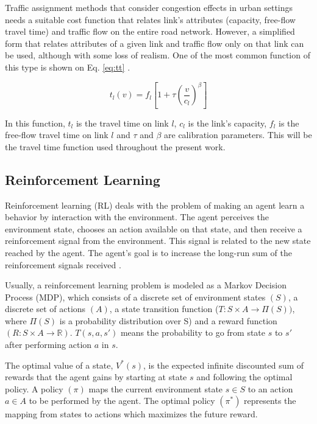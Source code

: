 \documentclass[12pt]{article}
\newcommand{\travTime}{\ensuremath{t_l}} 	%
\newcommand{\fftt}{\ensuremath{f_l}} 		%
\newcommand{\linkCap}{\ensuremath{c_l}}		%
\newcommand{\veh}{\ensuremath{v}}		%
\begin{document}
Traffic assignment methods that consider congestion effects in urban settings needs a suitable cost function that relates link's attributes (capacity, free-flow travel time) and traffic flow on the entire road network. However, a simplified form that relates attributes of a  given link and traffic flow only on that link can be used, although with some loss of realism. One of the most common function of this type is shown on Eq. \eqref{eq:tt} \cite{Ortuzar&Willumsen2001}.

\begin{equation}
\label{eq:tt}
\travTime(\veh) = \fftt[1 + \tau \left(\frac{\veh}{\linkCap}\right)^\beta]
\end{equation}

In this function, $\travTime$ is the travel time on link $l$, $\linkCap$ is the link's capacity, $\fftt$ is the free-flow travel time on link $l$ and $\tau$ and $\beta$ are calibration parameters. This will be the travel time function used throughout the present work.

\subsection{Reinforcement Learning}

Reinforcement learning (RL) deals with the problem of making an agent learn a behavior by interaction with the environment. The agent perceives the environment state, chooses an action available on that state, and then receive a reinforcement signal from the environment. This signal is related to the new state reached by the agent. The agent's goal is to increase the long-run sum of the reinforcement signals received \cite{Kaelbling+1996}.

Usually, a reinforcement learning problem is modeled as a Markov Decision Process (MDP), which consists of a discrete set of environment states $(S)$, a discrete set of actions $(A)$, a state transition function ($T: S \times A \to \Pi(S))$, where $\Pi(S)$ is a probability distribution over S) and a reward function $(R: S \times A \to \mathbb{R})$. $T(s, a, s')$ means the probability to go from state $s$ to $s'$ after performing action $a$ in $s$.

The optimal value of a state, $V^*(s)$, is the expected infinite discounted sum of rewards that the agent gains by starting at state $s$ and following the optimal policy. A policy $(\pi)$ maps the current environment state $s \in S$ to an action $a \in A$ to be performed by the agent. The optimal policy $(\pi^*)$ represents the mapping from states to actions which maximizes the future reward.
\end{document}
